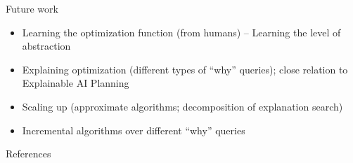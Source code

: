 \documentclass[12pt,aspectratio=169]{beamer}
\begin{document}
% 

% 
% 

\begin{frame}{Future work}
\begin{itemize}
 \item Learning the optimization function (from humans) -- Learning the level of abstraction
\item Explaining optimization (different types of ``why'' queries); close relation to Explainable AI Planning \cite{fox2017explainable}
\item Scaling up (approximate algorithms; decomposition of explanation search)
\item Incremental algorithms over different ``why'' queries
\end{itemize}

 
\end{frame}

\begin{frame}{References}

\def\bibfont{\footnotesize} 

\end{frame}
\end{document}
